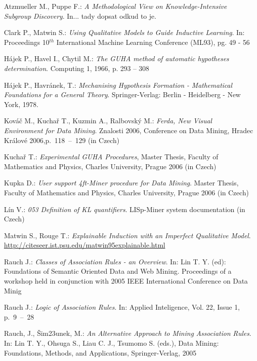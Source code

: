 \documentclass{llncs}
\begin{document}
\begin{thebibliography}{20}

Atzmueller M., Puppe F.: \emph{A Methodological View on Knowledge-Intensive Subgroup
Discovery}. In... tady dopsat odkud to je.

Clark P., Matwin S.: \emph{Using Qualitative Models to Guide Inductive Learning}.
In: Proceedings 10$^{th}$ International Machine Learning Conference (ML93), pg. 
49 - 56

H\'{a}jek P., Havel I., Chytil M.: \emph{The GUHA method of
automatic hypotheses determination}. Computing 1, 1966, p. 293 -- 308

H\'{a}jek P., Havr\'{a}nek, T.: \emph{Mechanising Hypothesis
Formation - Mathematical  Foundations  for  a   General  Theory}.
Springer-Verlag: Berlin  - Heidelberg - New York, 1978.

Kov\'{a}\v{c} M., Kucha\v{r} T., Kuzmin A., Ralbovsk\'{y} M.: \emph{Ferda, 
New Visual Environment for Data Mining}. Znalosti 2006, 
Conference on Data Mining, Hradec Kr\'{a}lov\'{e} 2006,p.~118~--~129 (in Czech)

Kucha\v{r} T.: \emph{Experimental GUHA Procedures}, Master Thesis, 
Faculty of Mathematics and Physics, Charles University, Prague 2006 (in Czech)

Kupka D.: \emph{User support 4ft-Miner procedure for Data Mining}. Master Thesis,
Faculty of Mathematics and Physics, Charles University, Prague 2006 (in Czech)

L\'{i}n V.: \emph{053 Definition of KL quantifiers}. LISp-Miner system documentation
(in Czech)

Matwin S., Rouge T.: \emph{Explainable Induction with an Imperfect Qualitative Model}.
\url{http://citeseer.ist.psu.edu/matwin95explainable.html}

Rauch J.: \emph{Classes of Association Rules - an Overview}. In: Lin T. Y. (ed): 
Foundations of Semantic Oriented Data and Web Mining. Proceedings of a workshop
held in conjunction with 2005 IEEE International Conference on Data Minig

Rauch J.: \emph{Logic of Association Rules}. In: Applied Inteligence, Vol. 22,
Issue 1, p.~9~--~28

Rauch, J., \v{S}im\accent23unek, M.: \emph{An Alternative Approach to Mining
Association Rules}. In: Lin T. Y., Ohsuga S., Liau C. J., Tsumomo S. (eds.),
Data Mining: Foundations, Methods, and Applications, Springer-Verlag, 2005


\end{thebibliography}
\end{document}
